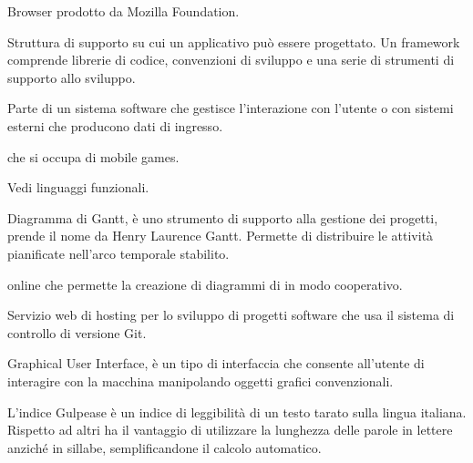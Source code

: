 \begin{itemize}


Browser  prodotto da Mozilla Foundation.


Struttura di supporto su cui un applicativo può essere progettato.
Un framework comprende librerie di codice, convenzioni di sviluppo e una serie di strumenti di supporto allo sviluppo.


Parte di un sistema software che gestisce l'interazione con l'utente o con sistemi esterni che producono dati di ingresso.


 che si occupa di mobile games.


Vedi linguaggi funzionali.

\end{itemize}


\begin{itemize}


Diagramma di Gantt, è uno strumento di supporto alla gestione dei progetti, prende il nome da Henry Laurence Gantt.
Permette di distribuire le attività pianificate nell'arco temporale stabilito.


 online che permette la creazione di diagrammi di  in modo cooperativo.


Servizio web di hosting per lo sviluppo di progetti software che usa il sistema di controllo di versione Git.


Graphical User Interface, è un tipo di interfaccia che consente all'utente di interagire con la macchina manipolando oggetti grafici convenzionali.


L'indice Gulpease è un indice di leggibilità di un testo tarato sulla lingua italiana. Rispetto ad altri ha il vantaggio di utilizzare la lunghezza delle parole in lettere anziché in sillabe, semplificandone il calcolo automatico.

\end{itemize}

